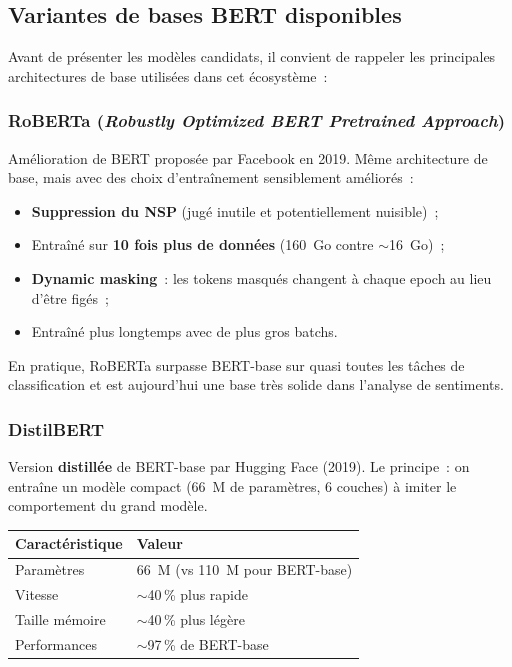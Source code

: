 \documentclass[12pt,a4paper]{report}
\begin{document}
\subsection{Variantes de bases BERT disponibles}

Avant de présenter les modèles candidats, il convient de rappeler les principales
architectures de base utilisées dans cet écosystème~:

\subsubsection{RoBERTa (\textit{Robustly Optimized BERT Pretrained Approach})}

Amélioration de BERT proposée par Facebook en 2019. Même architecture de base, mais
avec des choix d'entraînement sensiblement améliorés~:
\begin{itemize}[leftmargin=1.5cm]
  \item \textbf{Suppression du NSP} (jugé inutile et potentiellement nuisible)~;
  \item Entraîné sur \textbf{10 fois plus de données} (160~Go contre $\sim$16~Go)~;
  \item \textbf{Dynamic masking}~: les tokens masqués changent à chaque epoch au lieu
    d'être figés~;
  \item Entraîné plus longtemps avec de plus gros batchs.
\end{itemize}
En pratique, RoBERTa surpasse BERT-base sur quasi toutes les tâches de classification
et est aujourd'hui une base très solide dans l'analyse de sentiments.

\vfill

\subsubsection{DistilBERT}

Version \textbf{distillée} de BERT-base par Hugging Face (2019). Le principe~: on
entraîne un modèle compact (66~M de paramètres, 6 couches) à imiter le comportement
du grand modèle.

\begin{center}
\begin{tabular}{@{}ll@{}}
  \toprule
  Caractéristique & Valeur \\
  \midrule
  Paramètres & 66~M (vs 110~M pour BERT-base) \\
  Vitesse & $\sim$40\,\% plus rapide \\
  Taille mémoire & $\sim$40\,\% plus légère \\
  Performances & $\sim$97\,\% de BERT-base \\
  \bottomrule
\end{tabular}
\end{center}
\end{document}
